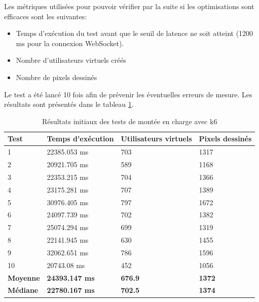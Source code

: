 Les métriques utilisées pour pouvoir vérifier par la suite si les optimisations sont efficaces sont les suivantes:

\begin{itemize}
  \item Temps d'exécution du test avant que le seuil de latence ne soit atteint (1200 ms pour la connexion WebSocket).
  \item Nombre d'utilisateurs virtuels créés
  \item Nombre de pixels dessinés
\end{itemize}

Le test a été lancé 10 fois afin de prévenir les éventuelles erreurs de mesure. Les résultats sont présentés dans le tableau \ref{table:k6-initial-results}.

\begin{table}[H]
  \centering
  \begin{tabular}{|l|l|l|l|}
    \hline
    \textbf{Test}    & \textbf{Temps d'exécution} & \textbf{Utilisateurs virtuels} & \textbf{Pixels dessinés} \\ \hline
    1                & 22385.053 ms               & 703                            & 1317                     \\ \hline
    2                & 20921.705 ms               & 589                            & 1168                     \\ \hline
    3                & 22353.215 ms               & 704                            & 1366                     \\ \hline
    4                & 23175.281 ms               & 707                            & 1389                     \\ \hline
    5                & 30976.405 ms               & 797                            & 1672                     \\ \hline
    6                & 24097.739 ms               & 702                            & 1382                     \\ \hline
    7                & 25074.294 ms               & 699                            & 1319                     \\ \hline
    8                & 22141.945 ms               & 630                            & 1455                     \\ \hline
    9                & 32062.651 ms               & 786                            & 1596                     \\ \hline
    10               & 20743.08 ms                & 452                            & 1056                     \\ \hline
    \textbf{Moyenne} & \textbf{24393.147 ms}      & \textbf{676.9}                 & \textbf{1372}            \\ \hline
    \textbf{Médiane} & \textbf{22780.167 ms}      & \textbf{702.5}                 & \textbf{1374}            \\ \hline
  \end{tabular}
  \caption{Résultats initiaux des tests de montée en charge avec k6}
  \label{table:k6-initial-results}
\end{table}

